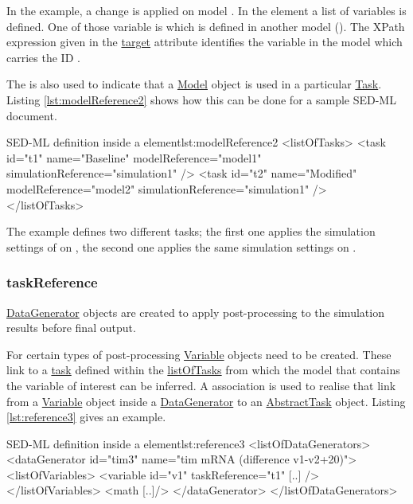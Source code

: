 In the example, a change is  applied on model . In the  element a list of variables is defined. One of those variable is  which is defined in another model (). The XPath expression given in the \hyperref[sec:target]{target} attribute identifies the variable in the model which carries the ID .

The  is also used to indicate that a \hyperref[class:model]{Model} object is used in a particular  \hyperref[class:task]{Task}. Listing \ref{lst:modelReference2} shows how this can be done for a sample SED-ML document.

\begin{myXmlLst}{SED-ML  definition inside a  element}{lst:modelReference2}
<listOfTasks>
	<task id="t1" name="Baseline" modelReference="model1" simulationReference="simulation1" />
	<task id="t2" name="Modified" modelReference="model2" simulationReference="simulation1" />
</listOfTasks>
\end{myXmlLst}

The example defines two different tasks; the first one applies the simulation settings of  on , the second one applies the same simulation settings on .


\subsubsection{taskReference}
\label{sec:taskReference}
\hyperref[class:dataGenerator]{DataGenerator} objects are created to apply post-processing to the simulation results before final output. 

For certain types of post-processing \hyperref[class:variable]{Variable} objects need to be created.
These link to a \hyperref[class:abstractTask]{task} defined within the \hyperref[sec:listOfTasks]{listOfTasks} from which the model that contains the variable of interest can be inferred. A  association is used to realise that link from a \hyperref[class:variable]{Variable} object inside a \hyperref[class:dataGenerator]{DataGenerator} to an \hyperref[class:abstractTask]{AbstractTask} object. Listing \ref{lst:reference3} gives an example.

\begin{myXmlLst}{SED-ML  definition inside a  element}{lst:reference3}
<listOfDataGenerators>
	<dataGenerator id="tim3" name="tim mRNA (difference v1-v2+20)">
	<listOfVariables>
   		<variable id="v1" taskReference="t1" [..] />
  	</listOfVariables>
  	<math [..]/>
	</dataGenerator>
</listOfDataGenerators>
\end{myXmlLst}

